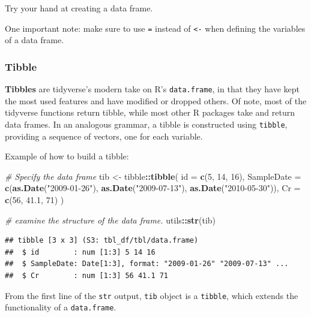 \documentclass[
]{book}
\newenvironment{Shaded}{\begin{snugshade}}{\end{snugshade}}
\newcommand{\AttributeTok}[1]{\textcolor[rgb]{0.13,0.29,0.53}{#1}}
\newcommand{\CommentTok}[1]{\textcolor[rgb]{0.56,0.35,0.01}{\textit{#1}}}
\newcommand{\DecValTok}[1]{\textcolor[rgb]{0.00,0.00,0.81}{#1}}
\newcommand{\FloatTok}[1]{\textcolor[rgb]{0.00,0.00,0.81}{#1}}
\newcommand{\FunctionTok}[1]{\textcolor[rgb]{0.13,0.29,0.53}{\textbf{#1}}}
\newcommand{\NormalTok}[1]{#1}
\newcommand{\OtherTok}[1]{\textcolor[rgb]{0.56,0.35,0.01}{#1}}
\newcommand{\SpecialCharTok}[1]{\textcolor[rgb]{0.81,0.36,0.00}{\textbf{#1}}}
\newcommand{\StringTok}[1]{\textcolor[rgb]{0.31,0.60,0.02}{#1}}
\begin{document}
Try your hand at creating a data frame.

One important note: make sure to use \texttt{=} instead of \texttt{\textless{}-} when defining the variables of a data frame.

\subsubsection{Tibble}\label{sec:tibble}

\textbf{Tibbles} are tidyverse's modern take on R's \texttt{data.frame}, in that they have kept the most used features and have modified or dropped others. Of note, most of the tidyverse functions return tibble, while most other R packages take and return data frames. In an analogous grammar, a tibble is constructed using \texttt{tibble}, providing a sequence of vectors, one for each variable.

Example of how to build a tibble:

\begin{Shaded}
\begin{Highlighting}[]
\CommentTok{\# Specify the data frame}
\NormalTok{tib }\OtherTok{\textless{}{-}}\NormalTok{ tibble}\SpecialCharTok{::}\FunctionTok{tibble}\NormalTok{(}
   \AttributeTok{id =} \FunctionTok{c}\NormalTok{(}\DecValTok{5}\NormalTok{, }\DecValTok{14}\NormalTok{, }\DecValTok{16}\NormalTok{),}
   \AttributeTok{SampleDate =} \FunctionTok{c}\NormalTok{(}\FunctionTok{as.Date}\NormalTok{(}\StringTok{"2009{-}01{-}26"}\NormalTok{), }\FunctionTok{as.Date}\NormalTok{(}\StringTok{"2009{-}07{-}13"}\NormalTok{), }
           \FunctionTok{as.Date}\NormalTok{(}\StringTok{"2010{-}05{-}30"}\NormalTok{)),}
   \AttributeTok{Cr =} \FunctionTok{c}\NormalTok{(}\DecValTok{56}\NormalTok{, }\FloatTok{41.1}\NormalTok{, }\DecValTok{71}\NormalTok{)}
\NormalTok{)}

\CommentTok{\# examine the structure of the data frame.}
\NormalTok{utils}\SpecialCharTok{::}\FunctionTok{str}\NormalTok{(tib)}
\end{Highlighting}
\end{Shaded}

\begin{verbatim}
## tibble [3 x 3] (S3: tbl_df/tbl/data.frame)
##  $ id        : num [1:3] 5 14 16
##  $ SampleDate: Date[1:3], format: "2009-01-26" "2009-07-13" ...
##  $ Cr        : num [1:3] 56 41.1 71
\end{verbatim}

From the first line of the \texttt{str} output, \texttt{tib} object is a \texttt{tibble}, which extends the functionality of a \texttt{data.frame}.
\end{document}
